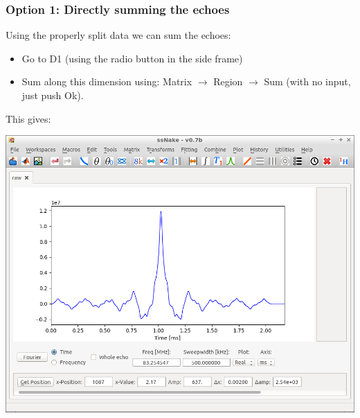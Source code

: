\documentclass[11pt,a4paper]{article}
\begin{document}
\subsubsection{Option 1: Directly summing the echoes}
Using the properly split data we can sum the echoes:
\begin{itemize}
  \item Go to D1 (using the radio button in the side frame)
  \item Sum along this dimension using: Matrix $\longrightarrow$ Region $\longrightarrow$ Sum (with
	 no input, just push Ok).
\end{itemize}
This gives:
\begin{center}
\includegraphics[width=0.7\linewidth]{Figs/Fig5.png}
\end{center}
\end{document}
